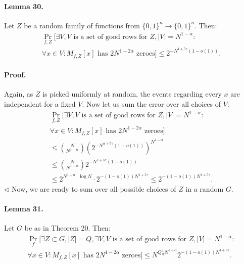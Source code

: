 \documentclass[10pt,a4paper]{article}
\begin{document}
\paragraph{Lemma 30.} Let $Z$ be a random family of functions from $\{0,1\}^n\to\{0,1\}^n$. Then:
\begin{multline*}
\Pr_{f,Z}[\exists V,V\text{ is a set of good rows for }Z,|V|=N^{1-\alpha}:\\
\forall x\in V:M_{f,Z}[x]\text{ has }2N^{1-2\alpha}\text{ zeroes}]\leq2^{-N^{1+5\gamma}(1-o(1))}.
\end{multline*}
\paragraph{Proof.} Again, as $Z$ is picked uniformly at random, the events regarding every $x$ are independent for a fixed $V$. Now let us sum the error over all choices of $V$:
\begin{multline*}
\Pr_{f,Z}[\exists V,V\text{ is a set of good rows for }Z,|V|=N^{1-\alpha}:\\
\forall x\in V:M_{f,Z}[x]\text{ has }2N^{1-2\alpha}\text{ zeroes}]\\
\leq\binom N{N^{1-\alpha}}\left(2^{-N^{\alpha+5\gamma}(1-o(1))}\right)^{N^{1-\alpha}}\\
\leq\binom N{N^{1-\alpha}}2^{-N^{1+5\gamma}(1-o(1))}\\
\leq2^{N^{1-\alpha}\cdot\log N}\cdot2^{-(1-o(1))N^{1+5\gamma}}\leq2^{-(1-o(1))N^{1+5\gamma}}.
\end{multline*}\hfill$\triangleleft$
Now, we are ready to sum over all possible choices of $Z$ in a random $G$.
\paragraph{Lemma 31.} Let $G$ be as in Theorem 20. Then:
\begin{multline*}
\Pr_f[\exists Z\subset G,|Z|=Q,\exists V,V\text{ is a set of good rows for }Z,|V|=N^{1-\alpha}:\\
\forall x\in V:M_{f,Z}[x]\text{ has }2N^{1-2\alpha}\text{ zeroes}]\leq N^{Q\frac14N^{1-\alpha}}2^{-(1-o(1))N^{1+5\gamma}}.
\end{multline*}
\end{document}
